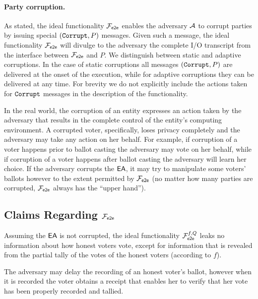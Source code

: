 \paragraph{Party corruption.} As stated, the ideal functionality
$\mathcal{F}_{\mathsf{e2e}}$ enables the adversary $\mathcal{A}$ to corrupt parties by issuing
special $(\mathtt{Corrupt}, P)$ messages.  Given such a message, the ideal
functionality $\mathcal{F}_{\mathsf{e2e}}$ will divulge to the adversary the complete I/O
transcript from the interface between $\mathcal{F}_{\mathsf{e2e}}$ and $P$. We distinguish
between static and adaptive corruptions. In the case of static
corruptions all messages $(\mathtt{Corrupt},P)$ are delivered at the onset of
the execution, while for adaptive corruptions they can be delivered at
any time.  For brevity we do not explicitly include the actions taken
for $\mathtt{Corrupt}$ messages in the description of the functionality.

In the real world, the corruption of an entity expresses an action
taken by the adversary that results in the complete control of the
entity's computing environment. A corrupted voter, specifically, loses
privacy completely and the adversary may take any action on her
behalf. For example, if corruption of a voter happens prior to ballot
casting the adversary may vote on her behalf, while if corruption of a
voter happens after ballot casting the adversary will learn her
choice. If the adversary corrupts the $\mathsf{EA}$, it may try to manipulate
some voters' ballots however to the extent permitted by $\mathcal{F}_{\mathsf{e2e}}$ (no
matter how many parties are corrupted, $\mathcal{F}_{\mathsf{e2e}}$ always has the ``upper
hand'').

\subsection{Claims Regarding $\mathcal{F}_{\mathsf{e2e}}$}

\begin{claim}
  Assuming the $\mathsf{EA}$ is not corrupted, the ideal functionality
  $\mathcal{F}_{\mathsf{e2e}}^{f,Q}$ leaks no information about how honest voters vote,
  except for information that is revealed from the partial tally of
  the votes of the honest voters (according to $f$).
\end{claim}

\begin{claim}
  The adversary may delay the recording of an honest voter's ballot,
  however when it is recorded the voter obtains a receipt that enables
  her to verify that her vote has been properly recorded and tallied.
\end{claim}

